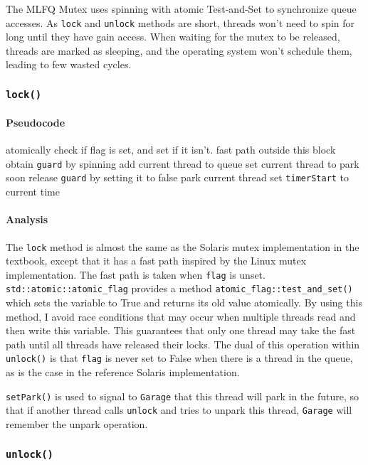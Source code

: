 \documentclass{article}
\begin{document}
\begin{multicols*}{2}
The MLFQ Mutex uses spinning with atomic Test-and-Set to synchronize queue accesses. As \verb|lock| and \verb|unlock| methods are short, threads won't need to spin for long until they have gain access. When waiting for the mutex to be released, threads are marked as sleeping, and the operating system won't schedule them, leading to few wasted cycles.
\subsubsection{\texttt{lock()}}
\paragraph{Pseudocode}
\begin{algorithmic}[1]
	\State atomically check if flag is set, and set if it isn't.
	 \Comment fast path outside this block
		 \State obtain \verb|guard| by spinning
		 \State add current thread to queue
		 \State set current thread to park soon
		 \State release \verb|guard| by setting it to false
		 \State park current thread
	\EndIf
	\State set \verb|timerStart| to current time
\end{algorithmic}
\paragraph{Analysis}
The \verb|lock| method is almost the same as the Solaris mutex implementation in the textbook, except that it has a fast path inspired by the Linux mutex implementation. The fast path is taken when \verb|flag| is unset. \verb|std::atomic::atomic_flag| provides a method \verb|atomic_flag::test_and_set()| which sets the variable to True and returns its old value atomically. By using this method, I avoid race conditions that may occur when multiple threads read and then write this variable. This guarantees that only one thread may take the fast path until all threads have released their locks. The dual of this operation within \verb|unlock()| is that \verb|flag| is never set to False when there is a thread in the queue, as is the case in the reference Solaris implementation.

\verb|setPark()| is used to signal to \verb|Garage| that this thread will park in the future, so that if another thread calls \verb|unlock| and tries to unpark this thread, \verb|Garage| will remember the unpark operation.
\subsubsection{\texttt{unlock()}}

\end{multicols*}
\end{document}
